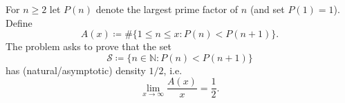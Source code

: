 For $n\ge 2$ let $P(n)$ denote the largest prime factor of $n$ (and set $P(1)=1$).
Define
\[
A(x) \coloneqq \#\bigl\{1\le n\le x : P(n)<P(n+1)\bigr\}.
\]
The problem asks to prove that the set
\[
\mathcal{S}\coloneqq \{n\in\mathbb{N} : P(n)<P(n+1)\}
\]
has (natural/asymptotic) density $1/2$, i.e.
\[
\lim_{x\to\infty}\frac{A(x)}{x}=\frac12.
\]
